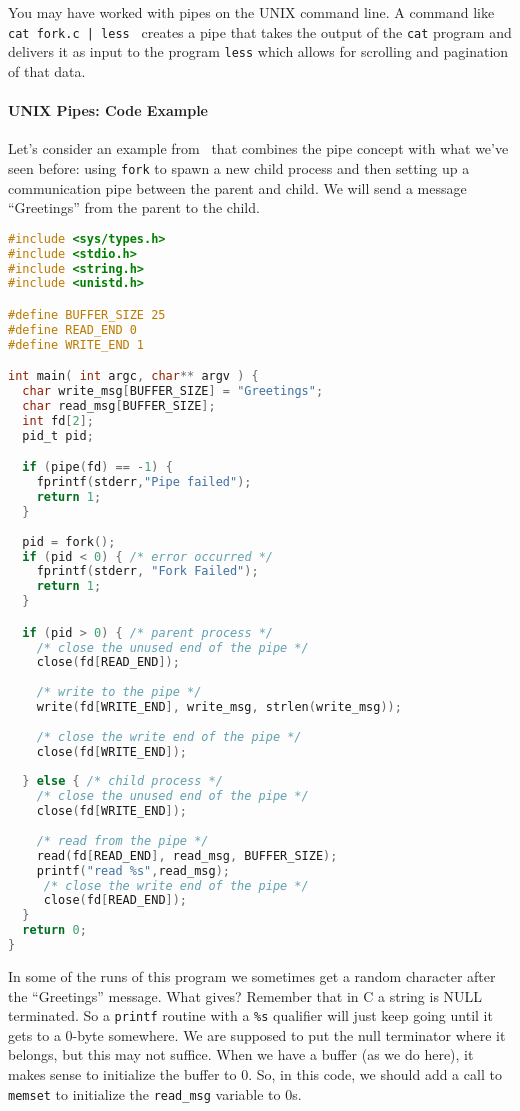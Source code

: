 You may have worked with pipes on the UNIX command line. A command like \texttt{ cat fork.c | less } creates a pipe that takes the output of the \texttt{cat} program and delivers it as input to the program \texttt{less} which allows for scrolling and pagination of that data.

\paragraph{UNIX Pipes: Code Example}

Let's consider an example from~\cite{osc} that combines the pipe concept with what we've seen before: using \texttt{fork} to spawn a new child process and then setting up a communication pipe between the parent and child. We will send a message ``Greetings'' from the parent to the child.

\begin{lstlisting}[language=C]
#include <sys/types.h> 
#include <stdio.h> 
#include <string.h> 
#include <unistd.h>

#define BUFFER_SIZE 25
#define READ_END 0 
#define WRITE_END 1

int main( int argc, char** argv ) {
  char write_msg[BUFFER_SIZE] = "Greetings"; 
  char read_msg[BUFFER_SIZE];
  int fd[2];
  pid_t pid;

  if (pipe(fd) == -1) {
    fprintf(stderr,"Pipe failed");
    return 1;
  }
  
  pid = fork();
  if (pid < 0) { /* error occurred */ 
    fprintf(stderr, "Fork Failed"); 
    return 1;
  }

  if (pid > 0) { /* parent process */
    /* close the unused end of the pipe */ 
    close(fd[READ_END]);
    
    /* write to the pipe */
    write(fd[WRITE_END], write_msg, strlen(write_msg));
    
    /* close the write end of the pipe */
    close(fd[WRITE_END]);
    
  } else { /* child process */
    /* close the unused end of the pipe */ 
    close(fd[WRITE_END]);
    
    /* read from the pipe */
    read(fd[READ_END], read_msg, BUFFER_SIZE); 
    printf("read %s",read_msg);
     /* close the write end of the pipe */
     close(fd[READ_END]);
  }
  return 0;
}
\end{lstlisting}

In some of the runs of this program we sometimes get a random character after the ``Greetings'' message. What gives? Remember that in C a string is NULL terminated. So a \texttt{printf} routine with a \texttt{\%s} qualifier will just keep going until it gets to a 0-byte somewhere. We are supposed to put the null terminator where it belongs, but this may not suffice. When we have a buffer (as we do here), it makes sense to initialize the buffer to 0. So, in this code, we should add a call to \texttt{memset} to initialize the \texttt{read\_msg} variable to 0s.

